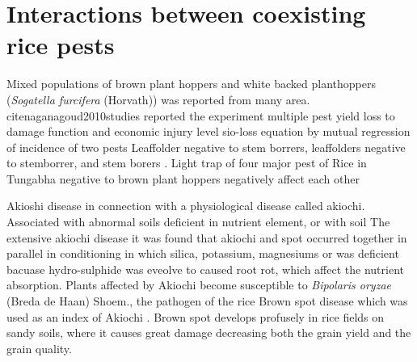 \section*{Interactions between coexisting rice pests}

Mixed populations of brown plant hoppers and white backed planthoppers (\textit{Sogatella furcifera} (Horvath)) was reported from many area. cite{naganagoud2010studies} reported the experiment multiple pest yield loss to damage function and economic injury level sio-loss equation by mutual regression of incidence of two pests Leaffolder negative to stem borrers, leaffolders negative to stemborrer, and stem borers \cite{selvaraj2012determination}. Light trap of four major pest of Rice in Tungabha negative to brown plant hoppers negatively affect each other\

Akioshi disease in connection with a physiological disease called akiochi.  Associated with abnormal soils deficient in nutrient element, or with soil  The extensive akiochi disease it was found that akiochi and spot occurred together in parallel in conditioning in which silica, potassium, magnesiums or  was deficient bacuase hydro-sulphide was eveolve to caused root rot, which affect the nutrient absorption. Plants affected by Akiochi become susceptible to \textit{Bipolaris oryzae} (Breda de Haan) Shoem., the pathogen of the rice Brown spot disease which was used as an index of Akiochi \cite{ouricedisease}. Brown spot develops profusely in rice fields on sandy soils, where it causes great damage decreasing both the grain yield and the grain quality.

